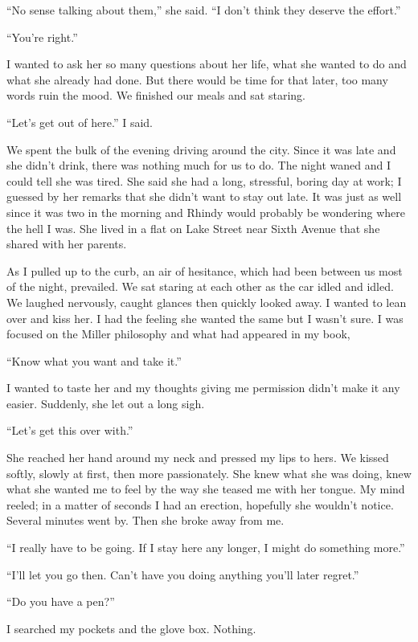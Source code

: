 ``No sense talking about them,'' she said. ``I don't think they deserve
the effort.''

``You're right.''

I wanted to ask her so many questions about her life, what she wanted to
do and what she already had done. But there would be time for that
later, too many words ruin the mood. We finished our meals and sat
staring.

``Let's get out of here.'' I said.

We spent the bulk of the evening driving around the city. Since it was
late and she didn't drink, there was nothing much for us to do. The
night waned and I could tell she was tired. She said she had a long,
stressful, boring day at work; I guessed by her remarks that she didn't
want to stay out late. It was just as well since it was two in the
morning and Rhindy would probably be wondering where the hell I was. She
lived in a flat on Lake Street near Sixth Avenue that she shared with
her parents.

As I pulled up to the curb, an air of hesitance, which had been between
us most of the night, prevailed. We sat staring at each other as the car
idled and idled. We laughed nervously, caught glances then quickly
looked away. I wanted to lean over and kiss her. I had the feeling she
wanted the same but I wasn't sure. I was focused on the Miller
philosophy and what had appeared in my book,

``Know what you want and take it.''

I wanted to taste her and my thoughts giving me permission didn't make
it any easier. Suddenly, she let out a long sigh.

``Let's get this over with.''

She reached her hand around my neck and pressed my lips to hers. We
kissed softly, slowly at first, then more passionately. She knew what
she was doing, knew what she wanted me to feel by the way she teased me
with her tongue. My mind reeled; in a matter of seconds I had an
erection, hopefully she wouldn't notice. Several minutes went by. Then
she broke away from me.

``I really have to be going. If I stay here any longer, I might do
something more.''

``I'll let you go then. Can't have you doing anything you'll later
regret.''

``Do you have a pen?''

I searched my pockets and the glove box. Nothing.

